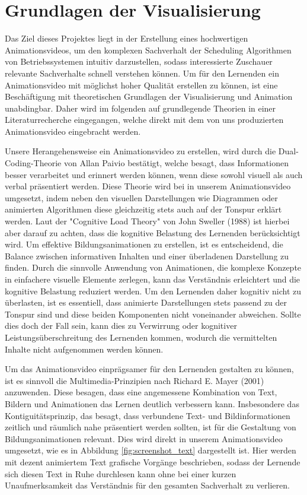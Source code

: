 
\chapter{Grundlagen der Visualisierung}
Das Ziel dieses Projektes liegt in der Erstellung eines hochwertigen Animationsvideos, um den komplexen Sachverhalt der Scheduling Algorithmen von Betriebssystemen intuitiv darzustellen, sodass interessierte Zuschauer relevante Sachverhalte schnell verstehen können. Um für den Lernenden ein Animationsvideo mit möglichst hoher Qualität erstellen zu können, ist eine Beschäftigung mit theoretischen Grundlagen der Visualisierung und Animation unabdingbar. Daher wird im folgenden auf grundlegende Theorien in einer Literaturrecherche eingegangen, welche direkt mit dem von uns produzierten Animationsvideo eingebracht werden. 

Unsere Herangehensweise ein Animationsvideo zu erstellen, wird durch die Dual-Coding-Theorie von Allan Paivio bestätigt, welche besagt, dass Informationen besser verarbeitet und erinnert werden können, wenn diese sowohl visuell als auch verbal präsentiert werden. Diese Theorie wird bei in unserem Animationsvideo umgesetzt, indem neben den visuellen Darstellungen wie Diagrammen oder animierten Algorithmen diese gleichzeitig stets auch auf der Tonspur erklärt werden. Laut der "Cognitive Load Theory" von John Sweller (1988) ist hierbei aber darauf zu achten, dass die kognitive Belastung des Lernenden berücksichtigt wird. Um effektive Bildungsanimationen zu erstellen, ist es entscheidend, die Balance zwischen informativen Inhalten und einer überladenen Darstellung zu finden. Durch die sinnvolle Anwendung von Animationen, die komplexe Konzepte in einfachere visuelle Elemente zerlegen, kann das Verständnis erleichtert und die kognitive Belastung reduziert werden. Um den Lernenden daher kognitiv nicht zu überlasten, ist es essentiell, dass animierte Darstellungen stets passend zu der Tonspur sind und diese beiden Komponenten nicht voneinander abweichen. Sollte dies doch der Fall sein, kann dies zu Verwirrung oder kognitiver Leistungsüberschreitung des Lernenden kommen, wodurch die vermittelten Inhalte nicht aufgenommen werden können. 

Um das Animationsvideo einprägsamer für den Lernenden gestalten zu können, ist es sinnvoll die Multimedia-Prinzipien nach Richard E. Mayer (2001) anzuwenden. Diese besagen, dass eine angemessene Kombination von Text, Bildern und Animationen das Lernen deutlich verbessern kann. Insbesondere das Kontiguitätsprinzip, das besagt, dass verbundene Text- und Bildinformationen zeitlich und räumlich nahe präsentiert werden sollten, ist für die Gestaltung von Bildungsanimationen relevant. Dies wird direkt in unserem Animationsvideo umgesetzt, wie es in Abbildung \ref{fig:screenshot_text} dargestellt ist. Hier werden mit dezent animiertem Text grafische Vorgänge beschrieben, sodass der Lernende sich diesen Text in Ruhe durchlesen kann ohne bei einer kurzen Unaufmerksamkeit das Verständnis für den gesamten Sachverhalt zu verlieren. 

